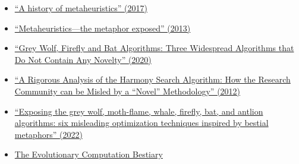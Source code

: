 \documentclass[letterpaper, 12pt]{article}
\begin{document}
\begin{itemize}
    \setlength\itemsep{-0.5em}
    \item \href{https://doi.org/10.48550/arXiv.1704.00853}{``A history of metaheuristics'' (2017)}
    \item \href{https://doi.org/10.1111/itor.12001}{``Metaheuristics—the metaphor exposed'' (2013)}
    \item \href{https://doi.org/10.1007/978-3-030-60376-2_10}{``Grey Wolf, Firefly and Bat Algorithms: Three Widespread Algorithms that Do Not Contain Any Novelty'' (2020)}
    \item \href{https://doi.org/10.4018/978-1-4666-0270-0.ch005}{``A Rigorous Analysis of the Harmony Search Algorithm: How the Research Community can be Misled by a “Novel” Methodology'' (2012)}
    \item \href{https://doi.org/10.1111/itor.13176}{``Exposing the grey wolf, moth-flame, whale, firefly, bat, and antlion algorithms: six misleading optimization techniques inspired by bestial metaphors'' (2022)}
    \item \href{https://fcampelo.github.io/EC-Bestiary/}{The Evolutionary Computation Bestiary}
\end{itemize}
\end{document}
